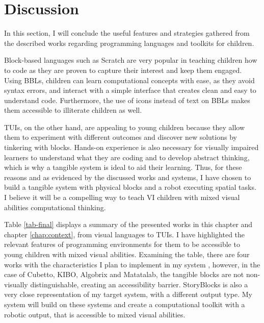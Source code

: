 \documentclass[oneside,%
                    author={Malak Hajji},
                    degree={BSc},
                    title={Designing An Accessible Ozobot Programming Platform for Students},
                  subtitle={With Mixed Visual Abilities}]{dissertation}
\begin{document}
\section{Discussion} 
In this section, I will conclude the useful features and strategies gathered from the described works regarding programming languages and toolkits for children. 

Block-based languages such as Scratch are very popular in teaching children how to code as they are proven to capture their interest and keep them engaged. Using BBLs, children can learn computational concepts with ease, as they avoid syntax errors, and interact with a simple interface that creates clean and easy to understand code. Furthermore, the use of icons instead of text on BBLs makes them accessible to illiterate children as well. 

TUIs, on the other hand, are appealing to young children because they allow them to experiment with different outcomes and discover new solutions by tinkering with blocks. 
Hands-on experience is also necessary for visually impaired learners to understand what they are coding and to develop abstract thinking, which is why a tangible system is ideal to aid their learning. Thus, for these reasons and as evidenced by the discussed works and systems, I have chosen to build a tangible system with physical blocks and a robot executing spatial tasks. I believe it will be a compelling way to teach VI children with mixed visual abilities computational thinking.

Table \ref{tab-final} displays a summary of the presented works in this chapter and chapter \ref{chap:context}, from visual languages to TUIs.
I have highlighted the relevant features of programming environments for them to be accessible to young children with mixed visual abilities. 
Examining the table, there are four works with the characteristics I plan to implement in my system , however, in the case of Cubetto\cite{Cubetto}, KIBO\cite{kibo}, Algobrix and Matatalab, the tangible blocks are not non-visually distinguishable, creating an accessibility barrier. StoryBlocks\cite{storyblocks} is also a very close representation of my target system, with a different output type. My system will build on these systems and create a computational toolkit with a robotic output, that is accessible to mixed visual abilities.

\end{document}
